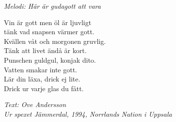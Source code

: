 {\footnotesize\textit{Melodi: Här är gudagott att vara}}\par
\vspace{10pt}
Vin är gott men öl är ljuvligt\\
tänk vad snapsen värmer gott.\\
Kvällen våt och morgonen gruvlig.\\
Tänk att livet ändå är kort.\\
Punschen guldgul, konjak dito.\\
Vatten smakar inte gott.\\
Lär din läxa, drick ej lite.\\
Drick ur varje glas du fått.\par
\vspace{10pt}
{\footnotesize\textit{Text: Ove Andersson\\ Ur spexet Jämmerdal,
    1994, Norrlands Nation i Uppsala}}
